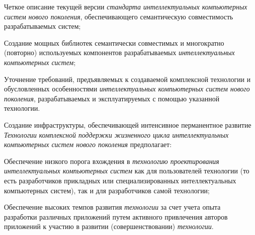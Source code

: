 \begin{textitemize}
	\item Четкое описание текущей версии \textit{стандарта интеллектуальных компьютерных систем нового поколения}, обеспечивающего семантическую совместимость разрабатываемых систем;
	\item Создание мощных библиотек семантически совместимых и многократно (повторно) используемых компонентов разрабатываемых \textit{интеллектуальных компьютерных систем};
	\item Уточнение требований, предъявляемых к создаваемой комплексной технологии и обусловленных особенностями \textit{интеллектуальных компьютерных систем нового поколения}, разрабатываемых и эксплуатируемых с помощью указанной технологии.
\end{textitemize}

Создание инфраструктуры, обеспечивающей интенсивное перманентное развитие \textit{Технологии} \textit{комплексной поддержки жизненного цикла интеллектуальных компьютерных систем нового поколения} предполагает:

\begin{textitemize}
	\item Обеспечение низкого порога вхождения в \textit{технологию проектирования интеллектуальных компьютерных систем} как для пользователей технологии (то есть разработчиков прикладных или специализированных интеллектуальных компьютерных систем), так и для разработчиков самой технологии;
	\item Обеспечение высоких темпов развития \textit{технологии} за счет учета опыта разработки различных приложений путем активного привлечения авторов приложений к участию в развитии (совершенствовании) \textit{технологии}.
\end{textitemize}

